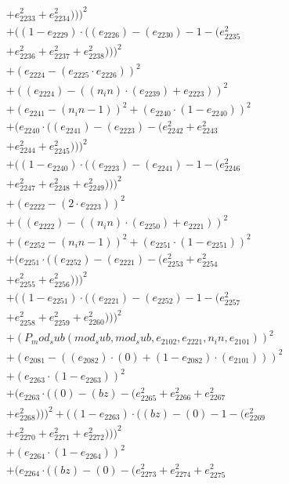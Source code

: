 \documentclass[10pt, a4paper]{article}
\begin{document}
\begin{align*}
& + e_{2233}^{2} + e_{2234}^{2})))^{2} \\
& + ((1 - e_{2229})  \cdot  ((e_{2226}) - (e_{2230}) - 1 - (e_{2235}^{2} \\
& + e_{2236}^{2} + e_{2237}^{2} + e_{2238}^{2})))^{2} \\
& + (e_{2224} - (e_{2225}  \cdot  e_{2226}))^{2} \\
& + ((e_{2224}) - ((n_in)  \cdot  (e_{2239}) + e_{2223}))^{2} \\
& + (e_{2241} - (n_in - 1))^{2} + (e_{2240}  \cdot  (1 - e_{2240}))^{2} \\
& + (e_{2240}  \cdot  ((e_{2241}) - (e_{2223}) - (e_{2242}^{2} + e_{2243}^{2} \\
& + e_{2244}^{2} + e_{2245}^{2})))^{2} \\
& + ((1 - e_{2240})  \cdot  ((e_{2223}) - (e_{2241}) - 1 - (e_{2246}^{2} \\
& + e_{2247}^{2} + e_{2248}^{2} + e_{2249}^{2})))^{2} \\
& + (e_{2222} - (2  \cdot  e_{2223}))^{2} \\
& + ((e_{2222}) - ((n_in)  \cdot  (e_{2250}) + e_{2221}))^{2} \\
& + (e_{2252} - (n_in - 1))^{2} + (e_{2251}  \cdot  (1 - e_{2251}))^{2} \\
& + (e_{2251}  \cdot  ((e_{2252}) - (e_{2221}) - (e_{2253}^{2} + e_{2254}^{2} \\
& + e_{2255}^{2} + e_{2256}^{2})))^{2} \\
& + ((1 - e_{2251})  \cdot  ((e_{2221}) - (e_{2252}) - 1 - (e_{2257}^{2} \\
& + e_{2258}^{2} + e_{2259}^{2} + e_{2260}^{2})))^{2} \\
& + (P_mod_sub(mod_sub, mod_sub, e_{2102}, e_{2221}, n_in, e_{2101}))^{2} \\
& + (e_{2081} - ((e_{2082})  \cdot  (0) + (1 - e_{2082})  \cdot  (e_{2101})))^{2} \\
& + (e_{2263}  \cdot  (1 - e_{2263}))^{2} \\
& + (e_{2263}  \cdot  ((0) - (bz) - (e_{2265}^{2} + e_{2266}^{2} + e_{2267}^{2} \\
& + e_{2268}^{2})))^{2} + ((1 - e_{2263})  \cdot  ((bz) - (0) - 1 - (e_{2269}^{2} \\
& + e_{2270}^{2} + e_{2271}^{2} + e_{2272}^{2})))^{2} \\
& + (e_{2264}  \cdot  (1 - e_{2264}))^{2} \\
& + (e_{2264}  \cdot  ((bz) - (0) - (e_{2273}^{2} + e_{2274}^{2} + e_{2275}^{2} \\

\end{align*}
\end{document}
